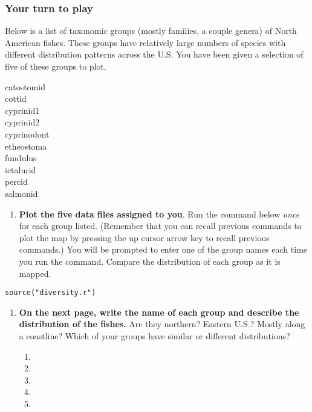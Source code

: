 \documentclass[11pt]{article}
\begin{document}
\subsubsection*{Your turn to play}

Below is a list of taxonomic groups (mostly families, a couple genera) of North American fishes.  These groups
have relatively large numbers of species with different distribution
patterns across the U.S. You have been given a selection of five of these groups to plot.

\begin{multicols}{2}
catostomid \\
cottid \\
cyprinid1 \\
cyprinid2 \\
cyprinodont \\
etheostoma \\
fundulus \\
ictalurid \\
percid \\
salmonid
\end{multicols}

\begin{enumerate}[resume]
\item \textbf{Plot the five data files assigned to you}. Run the command below \emph{once} for each group listed. (Remember that you can recall
previous commands to plot the map by pressing the up cursor
arrow key to recall previous commands.) You will be prompted to enter one of the group names each time you run the command. Compare the distribution of each group as it is mapped.
\end{enumerate}

\begin{verbatim}
source("diversity.r")
\end{verbatim}


\begin{enumerate}[resume]
\item \textbf{On the next page, write the name of each group and
describe the distribution of the fishes.} Are they northern? Eastern U.S.?
Mostly along a coastline? Which of your groups have similar or  different distributions? \vspace{\baselineskip}
	\begin{enumerate}[label=\alph*., leftmargin=*]
		\item %

		\item \vspace{5\baselineskip}

		\item \vspace{5\baselineskip}

		\item \vspace{5\baselineskip}

		\item \vspace{5\baselineskip}
	\end{enumerate}
\end{enumerate}
\end{document}
